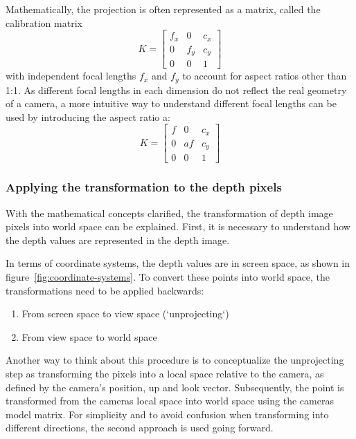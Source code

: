 Mathematically, the projection is often represented as a matrix, called the calibration matrix
\begin{equation}
    K = \begin{bmatrix}
            f_x & 0   & c_x \\
            0   & f_y & c_y \\
            0   & 0   & 1
    \end{bmatrix}
\end{equation}
with independent focal lengths $f_x$ and $f_y$ to account for aspect ratios other than 1:1.
As different focal lengths in each dimension do not reflect the real geometry of a camera,
a more intuitive way to understand different focal lengths can be used by introducing the aspect ratio a:
\begin{equation}
    K = \begin{bmatrix}
            f & 0  & c_x \\
            0 & af & c_y \\
            0 & 0  & 1
    \end{bmatrix}
\end{equation}
\parencite{szeliski_computer_nodate}




\subsubsection{Applying the transformation to the depth pixels}
With the mathematical concepts clarified, the transformation of depth image pixels into world space can be explained.
First, it is necessary to understand how the depth values are represented in the depth image.

In terms of coordinate systems, the depth values are in screen space, as shown in figure~\ref{fig:coordinate-systems}.
To convert these points into world space, the transformations need to be applied backwards:
\begin{enumerate}
    \item From screen space to view space (`unprojecting`)
    \item From view space to world space
\end{enumerate}
Another way to think about this procedure is to conceptualize the unprojecting step as transforming the pixels into a local space
relative to the camera, as defined by the camera's position, up and look vector.
Subsequently, the point is transformed from the cameras local space into world space using the cameras model matrix.
For simplicity and to avoid confusion when transforming into different directions, the second approach is used going forward.

